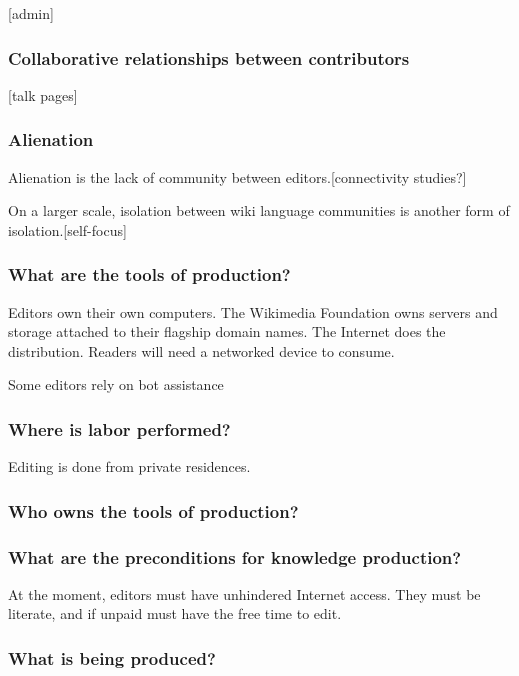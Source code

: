 \documentclass[format=sigconf, authorversion]{acmart}
\begin{document}
[admin]

\subsubsection{Collaborative relationships between contributors}

[talk pages]

\subsubsection{Alienation}

Alienation is the lack of community between editors.[connectivity studies?]

On a larger scale, isolation between wiki language communities is another form of isolation.[self-focus]

\subsubsection{What are the tools of production?}

Editors own their own computers.  The Wikimedia Foundation owns servers and storage attached to their flagship domain names.  The Internet does the distribution.  Readers will need a networked device to consume.

Some editors rely on bot assistance

\subsubsection{Where is labor performed?}

Editing is done from private residences.

\subsubsection{Who owns the tools of production?}



\subsubsection{What are the preconditions for knowledge production?}

At the moment, editors must have unhindered Internet access.  They must be literate, and if unpaid must have the free time to edit.

\subsubsection{What is being produced?}
\end{document}
